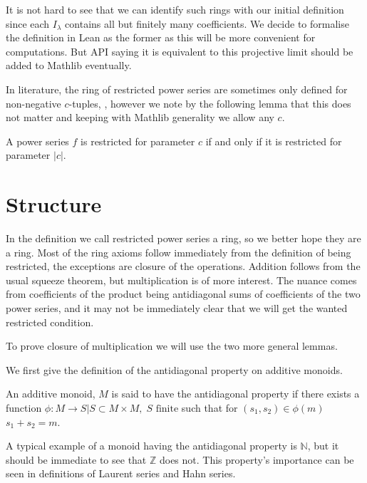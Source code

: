 It is not hard to see that we can identify such rings with our initial definition since each $I_\lambda$
contains all but finitely many coefficients. We decide to formalise the definition in Lean as the former
as this will be more convenient for computations. But API saying it is equivalent to this projective
limit should be added to Mathlib eventually.

In literature, the ring of restricted power series are sometimes only defined for non-negative $c$-tuples,
\cite{Gouvea}, however we note by the following lemma that this does not matter and keeping with
Mathlib generality we allow any $c$.

\begin{lemma}
  A power series $f$ is restricted for parameter $c$ if and only if it is restricted for parameter
  $\lvert c \rvert$.
\end{lemma}

\section{Structure}

In the definition we call restricted power series a ring, so we better hope they are a ring. Most of
the ring axioms follow immediately from the definition of being restricted, the exceptions are
closure of the operations.
Addition follows from the usual squeeze theorem, but multiplication is of
more interest.
The nuance comes from coefficients of the product being antidiagonal sums of coefficients
of the two power series, and it may not be immediately clear that we will get the wanted restricted
condition.

To prove closure of multiplication we will use the two more general lemmas.

We first give the definition of the antidiagonal property on additive monoids.

\begin{definition} %
  An additive monoid, $M$ is said to have the antidiagonal property if there exists a function
  $ \phi : M \to {S | S \subset M \times M, \; S \text{ finite}}$ such that for $(s_1, s_2) \in \phi (m)$
  $s_1 + s_2 = m$.
\end{definition}

A typical example of a monoid having the antidiagonal property is $\mathbb{N}$, but it should be
immediate to see that $\mathbb{Z}$ does not. This property's importance can be seen in definitions
of Laurent series and Hahn series. %


